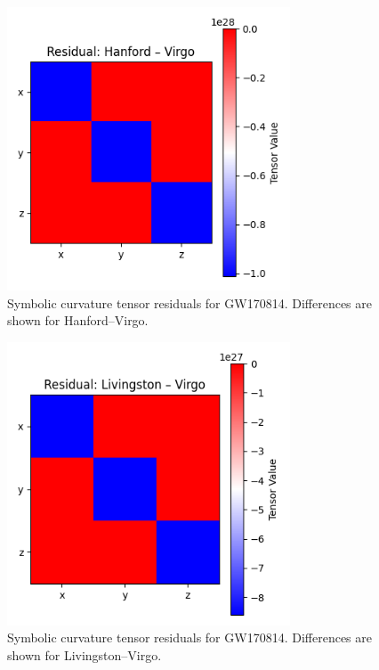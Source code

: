\documentclass[11pt]{article}
\begin{document}
	\begin{figure}[H]
		\centering
		\includegraphics[width=0.75\textwidth]{GW170817_Hanford_Virgo_residual.png}
		\caption{Symbolic curvature tensor residuals for GW170814. Differences are shown for Hanford–Virgo.}
		\label{fig:GW170817_Hanford_Virgo_Residuals}
	\end{figure}
	
	\begin{figure}[H]
		\centering
		\includegraphics[width=0.75\textwidth]{GW170817_Livingston_Virgo_residual.png}
		\caption{Symbolic curvature tensor residuals for GW170814. Differences are shown for Livingston–Virgo.}
		\label{fig:GW170817_Livingston_Virgo_Residuals}
	\end{figure}
	
\end{document}
